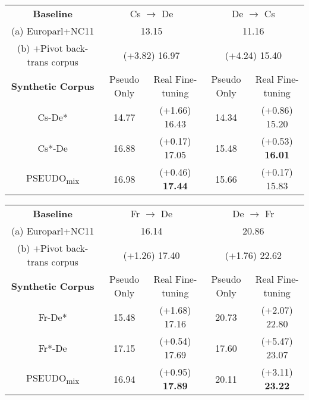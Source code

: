 \documentclass[11pt,letterpaper]{article}
\begin{document}
\begin{table*}[t]
\centering
	\begin{subtable}[t]{\columnwidth}
		\centering
		\begin{tabular}{c||cc||cc}
        		\hline
                \textbf{Baseline} & \multicolumn{2}{c||}{Cs \(\rightarrow\) De} & \multicolumn{2}{c}{De \(\rightarrow\) Cs} \\
				(a) Europarl+NC11 & \multicolumn{2}{c||}{13.15} & \multicolumn{2}{c}{11.16} \\ 
                (b) +Pivot back-trans corpus & \multicolumn{2}{c||}{{\scriptsize(+3.82)} 16.97} & \multicolumn{2}{c}{{\scriptsize(+4.24)} 15.40} \\ \hline\hline
				\textbf{Synthetic Corpus} & Pseudo Only & Real Fine-tuning & Pseudo Only & Real Fine-tuning \\
                Cs-De* & 14.77 & {\scriptsize(+1.66)} 16.43 & 14.34 & {\scriptsize(+0.86)} 15.20 \\
                Cs*-De & 16.88 & {\scriptsize(+0.17)} 17.05 & 15.48 & {\scriptsize(+0.53)} \textbf{16.01} \\
                PSEUDO\textsubscript{mix} & 16.98 & {\scriptsize(+0.46)} \textbf{17.44} & 15.66 & {\scriptsize(+0.17)} 15.83 \\
            \hline
		\end{tabular}
		\label{tab:real_finetuning_csde_newstest2011}
        \caption{Cs \(\leftrightarrow\) De}
	\end{subtable}%
	\qquad
    \begin{subtable}[t]{\columnwidth}
		\centering
		\begin{tabular}{c||cc||cc}
        		\hline
                \textbf{Baseline} & \multicolumn{2}{c||}{Fr \(\rightarrow\) De} & \multicolumn{2}{c}{De \(\rightarrow\) Fr} \\
				(a) Europarl+NC11 & \multicolumn{2}{c||}{16.14} & \multicolumn{2}{c}{20.86} \\ 
                (b) +Pivot back-trans corpus & \multicolumn{2}{c||}{{\scriptsize(+1.26)} 17.40} & \multicolumn{2}{c}{{\scriptsize(+1.76)} 22.62} \\ \hline\hline
				\textbf{Synthetic Corpus} & Pseudo Only & Real Fine-tuning & Pseudo Only & Real Fine-tuning \\
                Fr-De* & 15.48 & {\scriptsize(+1.68)} 17.16 & 20.73 & {\scriptsize(+2.07)} 22.80 \\
                Fr*-De & 17.15 & {\scriptsize(+0.54)} 17.69 & 17.60 & {\scriptsize(+5.47)} 23.07 \\
                PSEUDO\textsubscript{mix} & 16.94 & {\scriptsize(+0.95)} \textbf{17.89} & 20.11 & {\scriptsize(+3.11)} \textbf{23.22} \\
            \hline
		\end{tabular}
		\label{tab:real_finetuning_frde_newstest2011}
        \caption{Fr \(\leftrightarrow\) De}
	\end{subtable}
    

\end{table*}
\end{document}
